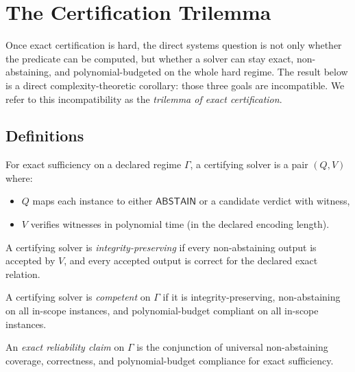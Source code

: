 \section{The Certification Trilemma}\label{sec:certification-trilemma}

Once exact certification is hard, the direct systems question is not only whether the predicate can be computed, but whether a solver can stay exact, non-abstaining, and polynomial-budgeted on the whole hard regime. The result below is a direct complexity-theoretic corollary: those three goals are incompatible. We refer to this incompatibility as the \emph{trilemma of exact certification}.

\subsection{Definitions}

\begin{definition}
For exact sufficiency on a declared regime $\Gamma$, a certifying solver is a pair $(Q,V)$ where:
\begin{itemize}
\item $Q$ maps each instance to either $\mathsf{ABSTAIN}$ or a candidate verdict with witness,
\item $V$ verifies witnesses in polynomial time (in the declared encoding length).
\end{itemize}
\end{definition}

\begin{definition}[Integrity]
A certifying solver is \emph{integrity-preserving} if every non-abstaining output is accepted by $V$, and every accepted output is correct for the declared exact relation.
\end{definition}

\begin{definition}[Competence]
A certifying solver is \emph{competent} on $\Gamma$ if it is integrity-preserving, non-abstaining on all in-scope instances, and polynomial-budget compliant on all in-scope instances.
\end{definition}

\begin{definition}
An \emph{exact reliability claim} on $\Gamma$ is the conjunction of universal non-abstaining coverage, correctness, and polynomial-budget compliance for exact sufficiency.
\end{definition}

